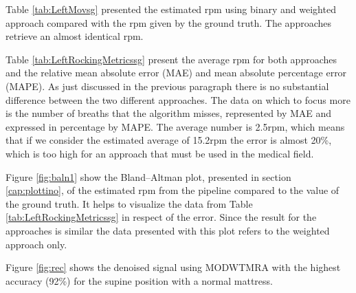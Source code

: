 Table \ref{tab:LeftMovsg} presented the estimated rpm using binary and weighted approach compared with the rpm given by the ground truth. The approaches retrieve an almost identical rpm. 

\vspace{0.5cm}


Table \ref{tab:LeftRockingMetricssg} present the average rpm for both approaches  
and the relative mean absolute error (MAE) and mean absolute percentage error (MAPE). As just discussed in the previous paragraph there is no substantial difference between the two different approaches. The data on which to focus more is the number of breaths that the algorithm misses, represented by MAE and expressed in percentage by MAPE. The average number is 2.5rpm, which means that if we consider the estimated average of 15.2rpm the error is almost 20\%, which is too high for an approach that must be used in the medical field.



Figure \ref{fig:baln1} show the Bland–Altman plot, presented in section \ref{cap:plottino}, of the estimated rpm from the pipeline compared to the value of the ground truth. It helps to visualize the data from Table \ref{tab:LeftRockingMetricssg} in respect of the error. Since the result for the approaches is similar the data presented with this plot refers to the weighted approach only.

Figure \ref{fig:rec} shows the denoised signal using MODWTMRA with the highest accuracy (92\%) for the supine position with a normal mattress.

